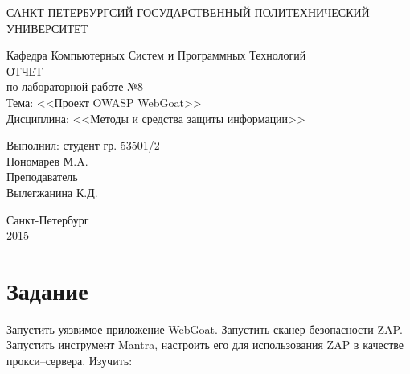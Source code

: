 \documentclass[utf8x, 12pt]{G7-32}
\begin{document}
\frontmatter 


\begin{center} 

\large САНКТ-ПЕТЕРБУРГСИЙ ГОСУДАРСТВЕННЫЙ ПОЛИТЕХНИЧЕСКИЙ УНИВЕРСИТЕТ

\large Кафедра Компьютерных Систем и Программных Технологий \\[5.5cm] 

\huge ОТЧЕТ \\[0.6cm] %
\large по лабораторной работе №8\\
\large Тема: <<Проект OWASP WebGoat>>\\
\large Дисциплина: <<Методы и средства защиты информации>>\\[3.7cm]

\end{center} 

\begin{flushright}
Выполнил: студент гр. 53501/2 \\
Пономарев М.A. \\[1.2cm]


Преподаватель \\
Вылегжанина К.Д.
\end{flushright}


\vfill 

\begin{center} 
\large Санкт-Петербург \\
2015
\end{center} 

\thispagestyle{empty}



\thispagestyle{empty}
\setcounter{page}{0}
\tableofcontents
\clearpage
\mainmatter


\chapter{Задание}
Запустить уязвимое приложение WebGoat. Запустить сканер безопасности ZAP. Запустить инструмент Mantra, настроить его для использования ZAP в качестве прокси--сервера. Изучить:
\end{document}
